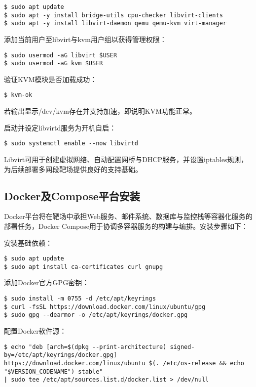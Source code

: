 \documentclass[lang=cn,10pt]{elegantbook}
\begin{document}
\begin{verbatim}
$ sudo apt update
$ sudo apt -y install bridge-utils cpu-checker libvirt-clients 
$ sudo apt -y install libvirt-daemon qemu qemu-kvm virt-manager
\end{verbatim}

添加当前用户至libvirt与kvm用户组以获得管理权限：

\begin{verbatim}
$ sudo usermod -aG libvirt $USER
$ sudo usermod -aG kvm $USER
\end{verbatim}

验证KVM模块是否加载成功：

\begin{verbatim}
$ kvm-ok
\end{verbatim}

若输出显示/dev/kvm存在并支持加速，即说明KVM功能正常。

启动并设定libvirtd服务为开机自启：

\begin{verbatim}
$ sudo systemctl enable --now libvirtd
\end{verbatim}

Libvirt可用于创建虚拟网络、自动配置网桥与DHCP服务，并设置iptables规则，为后续部署多网段靶场提供良好的支持基础。

\subsection{Docker及Compose平台安装}

Docker平台将在靶场中承担Web服务、邮件系统、数据库与监控栈等容器化服务的部署任务，Docker Compose用于协调多容器服务的构建与编排。安装步骤如下：

安装基础依赖：

\begin{verbatim}
$ sudo apt update
$ sudo apt install ca-certificates curl gnupg
\end{verbatim}

添加Docker官方GPG密钥：

\begin{verbatim}
$ sudo install -m 0755 -d /etc/apt/keyrings
$ curl -fsSL https://download.docker.com/linux/ubuntu/gpg
$ sudo gpg --dearmor -o /etc/apt/keyrings/docker.gpg
\end{verbatim}

配置Docker软件源：

\begin{verbatim}
$ echo "deb [arch=$(dpkg --print-architecture) signed-by=/etc/apt/keyrings/docker.gpg]
https://download.docker.com/linux/ubuntu $(. /etc/os-release && echo "$VERSION_CODENAME") stable"
| sudo tee /etc/apt/sources.list.d/docker.list > /dev/null
\end{verbatim}
\end{document}

